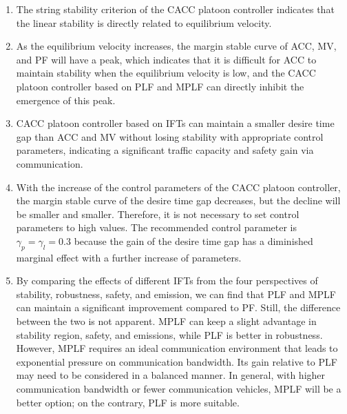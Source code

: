 \documentclass[journal]{IEEEtran}
\begin{document}
\begin{enumerate}
  \item The string stability criterion of the CACC platoon controller indicates that the linear stability is directly related to equilibrium velocity.
  \item As the equilibrium velocity increases, the margin stable curve of ACC, MV, and PF will have a peak, which indicates that it is difficult for ACC to maintain stability when the equilibrium velocity is low, and the CACC platoon controller based on PLF and MPLF can directly inhibit the emergence of this peak.
  \item CACC platoon controller based on IFTs can maintain a smaller desire time gap than ACC and MV without losing stability with appropriate control parameters, indicating a significant traffic capacity and safety gain via communication.
  \item With the increase of the control parameters of the CACC platoon controller, the margin stable curve of the desire time gap decreases, but the decline will be smaller and smaller. Therefore, it is not necessary to set control parameters to high values. The recommended control parameter is $\gamma_p=\gamma_l=0.3$ because the gain of the desire time gap has a diminished marginal effect with a further increase of parameters.
  \item By comparing the effects of different IFTs from the four perspectives of stability, robustness, safety, and emission, we can find that PLF and MPLF can maintain a significant improvement compared to PF. Still, the difference between the two is not apparent. MPLF can keep a slight advantage in stability region, safety, and emissions, while PLF is better in robustness. However, MPLF requires an ideal communication environment that leads to exponential pressure on communication bandwidth. Its gain relative to PLF may need to be considered in a balanced manner. In general, with higher communication bandwidth or fewer communication vehicles, MPLF will be a better option; on the contrary, PLF is more suitable.
\end{enumerate}





\end{document}
